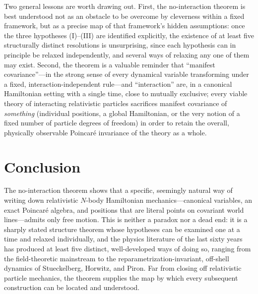 \documentclass[11pt]{article}
\begin{document}
Two general lessons are worth drawing out. First, the no-interaction theorem is best understood not as an obstacle to be overcome by cleverness within a fixed framework, but as a precise map of that framework's hidden assumptions: once the three hypotheses (I)--(III) are identified explicitly, the existence of at least five structurally distinct resolutions is unsurprising, since each hypothesis can in principle be relaxed independently, and several ways of relaxing any one of them may exist. Second, the theorem is a valuable reminder that ``manifest covariance''---in the strong sense of every dynamical variable transforming under a fixed, interaction-independent rule---and ``interaction'' are, in a canonical Hamiltonian setting with a single time, close to mutually exclusive; every viable theory of interacting relativistic particles sacrifices manifest covariance of \emph{something} (individual positions, a global Hamiltonian, or the very notion of a fixed number of particle degrees of freedom) in order to retain the overall, physically observable Poincar\'e invariance of the theory as a whole.

\section{Conclusion}

The no-interaction theorem shows that a specific, seemingly natural way of writing down relativistic $N$-body Hamiltonian mechanics---canonical variables, an exact Poincar\'e algebra, and positions that are literal points on covariant world lines---admits only free motion. This is neither a paradox nor a dead end: it is a sharply stated structure theorem whose hypotheses can be examined one at a time and relaxed individually, and the physics literature of the last sixty years has produced at least five distinct, well-developed ways of doing so, ranging from the field-theoretic mainstream to the reparametrization-invariant, off-shell dynamics of Stueckelberg, Horwitz, and Piron. Far from closing off relativistic particle mechanics, the theorem supplies the map by which every subsequent construction can be located and understood.
\end{document}
